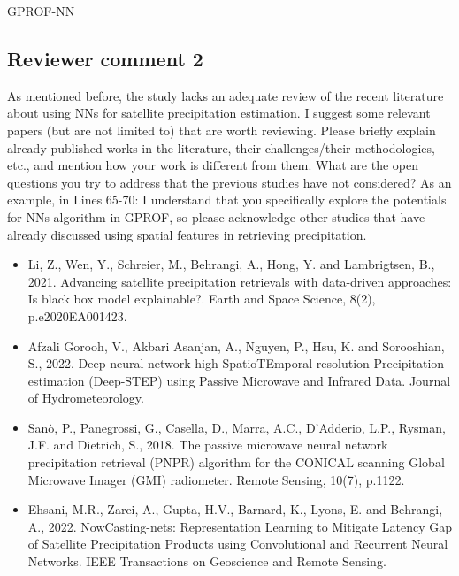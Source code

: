 \begin{change}[97]
\DIFaddend GPROF-NN \DIFdelbegin {}\DIFdelend \DIFaddbegin {}

\end{change}

\subsection*{Reviewer comment 2}

As mentioned before, the study lacks an adequate review of the recent literature about using NNs
for satellite precipitation estimation. I suggest some relevant papers (but are not limited to) that
are worth reviewing. Please briefly explain already published works in the literature, their
challenges/their methodologies, etc., and mention how your work is different from them. What are
the open questions you try to address that the previous studies have not considered?
As an example, in Lines 65-70: I understand that you specifically explore the potentials for NNs
algorithm in GPROF, so please acknowledge other studies that have already discussed using
spatial features in retrieving precipitation.

\begin{itemize}
\item Li, Z., Wen, Y., Schreier, M., Behrangi, A., Hong, Y. and Lambrigtsen, B., 2021. Advancing satellite precipitation
retrievals with data-driven approaches: Is black box model explainable?. Earth and Space Science, 8(2),
p.e2020EA001423.
\item Afzali Gorooh, V., Akbari Asanjan, A., Nguyen, P., Hsu, K. and Sorooshian, S., 2022. Deep neural network high
SpatioTEmporal resolution Precipitation estimation (Deep-STEP) using Passive Microwave and Infrared
Data. Journal of Hydrometeorology.
\item Sanò, P., Panegrossi, G., Casella, D., Marra, A.C., D’Adderio, L.P., Rysman, J.F. and Dietrich, S., 2018. The
passive microwave neural network precipitation retrieval (PNPR) algorithm for the CONICAL scanning Global
Microwave Imager (GMI) radiometer. Remote Sensing, 10(7), p.1122.
\item Ehsani, M.R., Zarei, A., Gupta, H.V., Barnard, K., Lyons, E. and Behrangi, A., 2022. NowCasting-nets:
Representation Learning to Mitigate Latency Gap of Satellite Precipitation Products using Convolutional and
Recurrent Neural Networks. IEEE Transactions on Geoscience and Remote Sensing.
\end{itemize}

